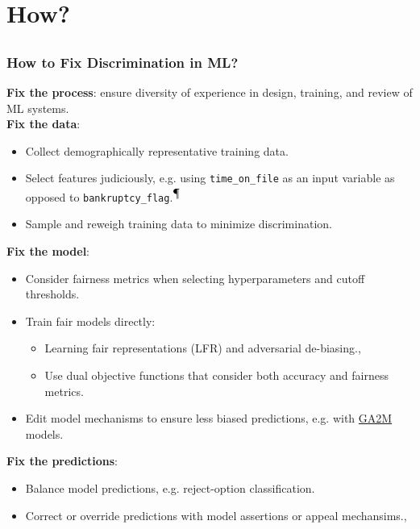 \documentclass[11pt,
               		aspectratio=169,
               		hyperref={colorlinks}
               		]{beamer}
\begin{document}
	\section{How?}
		\subsection*{}
		\begin{frame}			
			\frametitle{How to Fix Discrimination in ML?}
			\scriptsize
			\noindent \textbf{Fix the process}: ensure diversity of experience in design, training, and review of ML systems.\\
			\noindent \textbf{Fix the data}:
			\begin{itemize}\scriptsize
				\item Collect demographically representative training data.
				\item Select features judiciously, e.g. using \texttt{time\_on\_file} as an input variable as opposed to \texttt{bankruptcy\_flag}.\textsuperscript{$\mathparagraph$}
				\item Sample and reweigh training data to minimize discrimination.\cite{kamiran2012data}
			\end{itemize}
			\noindent \textbf{Fix the model}:
			\begin{itemize}\scriptsize
				\item Consider fairness metrics when selecting hyperparameters and cutoff thresholds.
				\item Train fair models directly:
				\begin{itemize}\scriptsize
					\item Learning fair representations (LFR) and adversarial de-biasing.\cite{zemel2013learning}, \cite{zhang2018mitigating}
					\item Use dual objective functions that consider both accuracy and fairness metrics.
				\end{itemize}
				\item Edit model mechanisms to ensure less biased predictions, e.g. with \href{https://github.com/interpretml/interpret}{GA2M} models.
			\end{itemize}		
			\noindent \textbf{Fix the predictions}: 
			\begin{itemize}\scriptsize
				\item Balance model predictions, e.g. reject-option classification.\cite{kamiran2012decision}	
				\item Correct or override predictions with model assertions or appeal mechansims.\cite{hall2019guidelines}, \cite{kangdebugging}
			\end{itemize}
		\end{frame}
\end{document}
